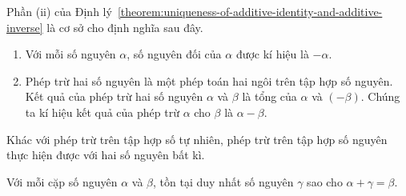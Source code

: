 Phần (ii) của Định lý~\ref{theorem:uniqueness-of-additive-identity-and-additive-inverse} là cơ sở cho định nghĩa sau đây.
\begin{definition}
	\begin{enumerate}[label={(\roman*)}]
		\item Với mỗi số nguyên $\alpha$, số nguyên đối của $\alpha$ được kí hiệu là $-\alpha$.
		\item Phép trừ hai số nguyên là một phép toán hai ngôi trên tập hợp số nguyên. Kết quả của phép trừ hai số nguyên $\alpha$ và $\beta$ là tổng của $\alpha$ và $(-\beta)$. Chúng ta kí hiệu kết quả của phép trừ $\alpha$ cho $\beta$ là $\alpha - \beta$.
	\end{enumerate}
\end{definition}

Khác với phép trừ trên tập hợp số tự nhiên, phép trừ trên tập hợp số nguyên thực hiện được với hai số nguyên bất kì.

\begin{theorem}\label{theorem:foundation-of-integer-subtraction}
	Với mỗi cặp số nguyên $\alpha$ và $\beta$, tồn tại duy nhất số nguyên $\gamma$ sao cho $\alpha + \gamma = \beta$.
\end{theorem}

